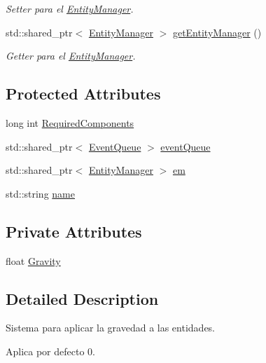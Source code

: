 \begin{DoxyCompactItemize}
\begin{DoxyCompactList}\small\item\em Setter para el \hyperlink{classant_1_1_entity_manager}{Entity\+Manager}. \end{DoxyCompactList}\item 
std\+::shared\+\_\+ptr$<$ \hyperlink{classant_1_1_entity_manager}{Entity\+Manager} $>$ \hyperlink{classant_1_1_system_adaad2087de7fc71924cfb5b134014b0a}{get\+Entity\+Manager} ()
\begin{DoxyCompactList}\small\item\em Getter para el \hyperlink{classant_1_1_entity_manager}{Entity\+Manager}. \end{DoxyCompactList}\end{DoxyCompactItemize}
\subsection*{Protected Attributes}
\begin{DoxyCompactItemize}
\item 
long int \hyperlink{classant_1_1_system_a4ef41cfc496e41ac6730f90629524ec7}{Required\+Components}
\item 
std\+::shared\+\_\+ptr$<$ \hyperlink{classant_1_1_event_queue}{Event\+Queue} $>$ \hyperlink{classant_1_1_system_a27e1814e13d161b5ef0e848e3da16d29}{event\+Queue}
\item 
std\+::shared\+\_\+ptr$<$ \hyperlink{classant_1_1_entity_manager}{Entity\+Manager} $>$ \hyperlink{classant_1_1_system_a5661d872ff769be150bd4e9a9552f6b9}{em}
\item 
std\+::string \hyperlink{classant_1_1_system_a60b3c00a760a3b4947ab1f1fc534a5b2}{name}
\end{DoxyCompactItemize}
\subsection*{Private Attributes}
\begin{DoxyCompactItemize}
\item 
float \hyperlink{classant_1_1gravity_system_afea117eea84efab64b7014697cfa8194}{Gravity}
\end{DoxyCompactItemize}


\subsection{Detailed Description}
Sistema para aplicar la gravedad a las entidades. 

Aplica por defecto 0.

